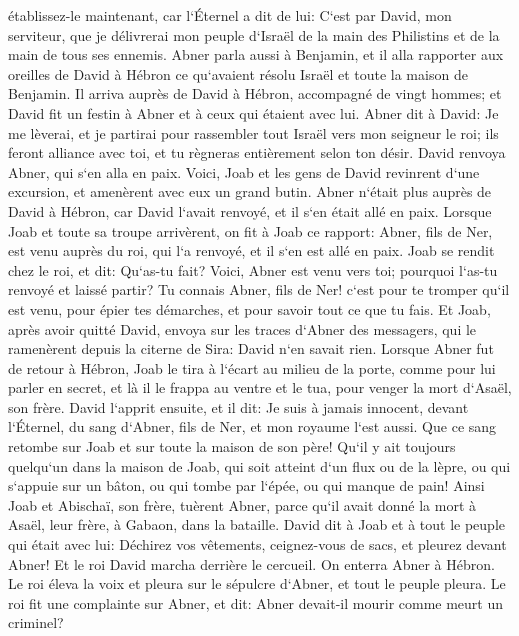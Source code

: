 \verse établissez-le maintenant, car l`Éternel a dit de lui: C`est par David, mon serviteur, que je délivrerai mon peuple d`Israël de la main des Philistins et de la main de tous ses ennemis. 
\verse Abner parla aussi à Benjamin, et il alla rapporter aux oreilles de David à Hébron ce qu`avaient résolu Israël et toute la maison de Benjamin. 
\verse Il arriva auprès de David à Hébron, accompagné de vingt hommes; et David fit un festin à Abner et à ceux qui étaient avec lui. 
\verse Abner dit à David: Je me lèverai, et je partirai pour rassembler tout Israël vers mon seigneur le roi; ils feront alliance avec toi, et tu règneras entièrement selon ton désir. David renvoya Abner, qui s`en alla en paix. 
\verse Voici, Joab et les gens de David revinrent d`une excursion, et amenèrent avec eux un grand butin. Abner n`était plus auprès de David à Hébron, car David l`avait renvoyé, et il s`en était allé en paix. 
\verse Lorsque Joab et toute sa troupe arrivèrent, on fit à Joab ce rapport: Abner, fils de Ner, est venu auprès du roi, qui l`a renvoyé, et il s`en est allé en paix. 
\verse Joab se rendit chez le roi, et dit: Qu`as-tu fait? Voici, Abner est venu vers toi; pourquoi l`as-tu renvoyé et laissé partir? 
\verse Tu connais Abner, fils de Ner! c`est pour te tromper qu`il est venu, pour épier tes démarches, et pour savoir tout ce que tu fais. 
\verse Et Joab, après avoir quitté David, envoya sur les traces d`Abner des messagers, qui le ramenèrent depuis la citerne de Sira: David n`en savait rien. 
\verse Lorsque Abner fut de retour à Hébron, Joab le tira à l`écart au milieu de la porte, comme pour lui parler en secret, et là il le frappa au ventre et le tua, pour venger la mort d`Asaël, son frère. 
\verse David l`apprit ensuite, et il dit: Je suis à jamais innocent, devant l`Éternel, du sang d`Abner, fils de Ner, et mon royaume l`est aussi. 
\verse Que ce sang retombe sur Joab et sur toute la maison de son père! Qu`il y ait toujours quelqu`un dans la maison de Joab, qui soit atteint d`un flux ou de la lèpre, ou qui s`appuie sur un bâton, ou qui tombe par l`épée, ou qui manque de pain! 
\verse Ainsi Joab et Abischaï, son frère, tuèrent Abner, parce qu`il avait donné la mort à Asaël, leur frère, à Gabaon, dans la bataille. 
\verse David dit à Joab et à tout le peuple qui était avec lui: Déchirez vos vêtements, ceignez-vous de sacs, et pleurez devant Abner! Et le roi David marcha derrière le cercueil. 
\verse On enterra Abner à Hébron. Le roi éleva la voix et pleura sur le sépulcre d`Abner, et tout le peuple pleura. 
\verse Le roi fit une complainte sur Abner, et dit: Abner devait-il mourir comme meurt un criminel? 
